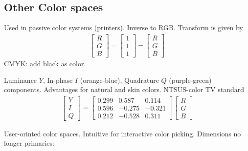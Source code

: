 \begin{compactdesc}
	\section{Other Color spaces}
\item[\lp{CMY Color Space}] Used in passive color systems (printers). Inverse to RGB. Transform is given by
	\begin{gather*}
	\!\left[\!\begin{smallmatrix}
			R\\
			G\\
			B
	\end{smallmatrix}\!\right]\!\!
	=
	\!\left[\!\begin{smallmatrix}
			1\\
			1\\
			1
	\end{smallmatrix}\!\right]\!\!
	-
	\!\left[\!\begin{smallmatrix}
			R\\
			G\\
			B
	\end{smallmatrix}\!\right]\!\!
	\end{gather*}
	CMYK: add black as color.
\item[\lp{YIQ Color Space}] Luminance $Y$, In-phase $I$ (orange-blue), Quadrature $Q$ (purple-green) components. Advantages for natural and skin colors. NTSUS-color TV standard
	\begin{gather*}
	\!\left[\!\begin{smallmatrix}
			Y\\
			I\\
			Q
	\end{smallmatrix}\!\right]\!\!
	=
	\!\!\left[\!\begin{smallmatrix}
			0.299&0.587&0.114\\
			0.596&-0.275&-0.321\\
			0.212&-0.528&0.311
	\end{smallmatrix}\!\right]\!\!
	\!\left[\!\begin{smallmatrix}
			R\\
			G\\
			B
	\end{smallmatrix}\!\right]\!\!
	\end{gather*}
\item[\lp{HSV and HSL/HSB Color Spaces}] User-orinted color spaces. Intuitive for interactive color picking. Dimensions no longer primaries:\\
	\begin{enumerate*}[label=\protect\circled{\arabic*},itemjoin=]

\end{enumerate*}
\end{compactdesc}
